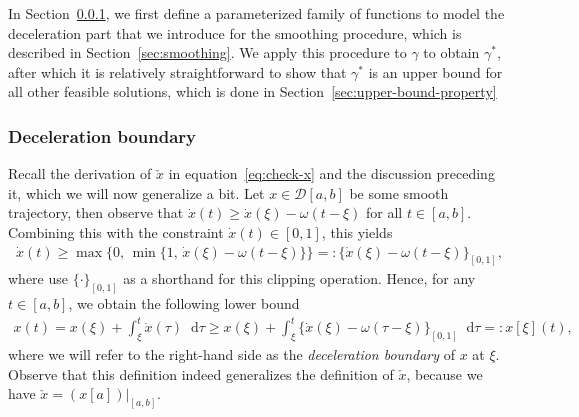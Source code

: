 \documentclass[a4paper]{article}
\theoremstyle{definition}
\theoremstyle{plain}
\newcommand*\diff{\mathop{}\!\mathrm{d}}
\begin{document}
In Section~\ref{sec:deceleration-boundary}, we first define a parameterized
family of functions to model the deceleration part that we introduce for the
smoothing procedure, which is described in Section~\ref{sec:smoothing}.
%
We apply this procedure to $\gamma$ to obtain $\gamma^{*}$, after which it is
relatively straightforward to show that $\gamma^{*}$ is an upper bound for all
other feasible solutions, which is done in
Section~\ref{sec:upper-bound-property}


\subsubsection{Deceleration boundary}\label{sec:deceleration-boundary}
%
Recall the derivation of $\check{x}$ in equation~\eqref{eq:check-x} and the discussion
preceding it, which we will now generalize a bit.
%
Let $x \in \mathcal{D}[a, b]$ be some smooth trajectory, then observe that $\dot{x}(t) \geq \dot{x}(\xi) - \omega(t - \xi)$ for all $t \in [a, b]$.
Combining this with the constraint $\dot{x}(t) \in [0, 1]$, this yields
\begin{align}
  \dot{x}(t) \geq \max\{ 0, \, \min\{1, \, \dot{x}(\xi) - \omega (t - \xi) \}\} =: \{\dot{x}(\xi) - \omega(t-\xi)\}_{[0,1]} ,
\end{align}
where use $\{ \cdot \}_{[0,1]}$ as a shorthand for this clipping operation.
%
Hence, for any $t \in [a,b]$, we obtain the following lower bound
\begin{align}\label{eq:deceleration-boundary}
  x(t) = x(\xi) + \int_{\xi}^{t} \dot{x}(\tau) \diff \tau \geq x(\xi) + \int_{\xi}^{t} \{\dot{x}(\xi) - \omega(\tau - \xi)\}_{[0,1]} \diff \tau =: x[\xi] (t) ,
\end{align}
where we will refer to the right-hand side as the \emph{deceleration boundary} of $x$
at $\xi$.
%
Observe that this definition indeed generalizes the definition of $\check{x}$,
because we have $\check{x}=(x[a])|_{[a,b]}$.
\end{document}
